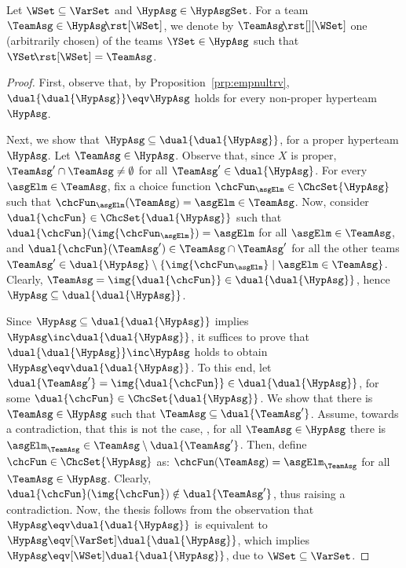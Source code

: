 \documentclass[authoryear]{elsarticle}
\newcommand{\EmpTeamAsg}{\emptyset}
\begin{document}
Let $\WSet \subseteq \VarSet$ and $\HypAsg \in \HypAsgSet$.
For a team $\TeamAsg \in \HypAsg \!\rst[\WSet]$, we denote by $\asgExtWX$
one (arbitrarily chosen) of the teams $\YSet \in \HypAsg$ such that $\YSet
\!\rst[\WSet] = \TeamAsg$.

\lmmdlti*
%
\begin{proof}
  First, observe that, by Proposition~\ref{prp:empnultrv},
  $\dual{\dual{\HypAsg}} \eqv \HypAsg$ holds for every non-proper hyperteam
  $\HypAsg$.

  Next, we show that $\HypAsg \subseteq \dual{\dual{\HypAsg}}$, for a proper
  hyperteam $\HypAsg$.
  Let $\TeamAsg \in \HypAsg$.
  Observe that, since $X$ is proper, $\TeamAsg' \cap \TeamAsg \neq \EmpTeamAsg$
  for all $\TeamAsg' \in \dual{\HypAsg}$.
  For every $\asgElm \in \TeamAsg$, fix a choice function $\chcFun_{\asgElm} \in
  \ChcSet{\HypAsg}$ such that $\chcFun_{\asgElm}(\TeamAsg) = \asgElm \in
  \TeamAsg$.
  Now, consider $\dual{\chcFun} \in \ChcSet{\dual{\HypAsg}}$ such that
  $\dual{\chcFun}(\img{\chcFun_{\asgElm}}) = \asgElm$ for all $\asgElm \in
  \TeamAsg$, and $\dual{\chcFun}(\TeamAsg') \in \TeamAsg \cap
  \TeamAsg'$ for all the other teams $\TeamAsg' \in \dual{\HypAsg}
  \setminus \{ \img{\chcFun_{\asgElm}} \mid \asgElm \in \TeamAsg \}$.
  Clearly, $\TeamAsg = \img{\dual{\chcFun}} \in \dual{\dual{\HypAsg}}$, hence
  $\HypAsg \subseteq \dual{\dual{\HypAsg}}$.

  Since $\HypAsg \subseteq \dual{\dual{\HypAsg}}$ implies $\HypAsg \inc
  \dual{\dual{\HypAsg}}$, it suffices to prove that $\dual{\dual{\HypAsg}} \inc
  \HypAsg$ holds to obtain $\HypAsg \eqv \dual{\dual{\HypAsg}}$.
  To this end, let $\dual{\TeamAsg'} = \img{\dual{\chcFun}} \in
  \dual{\dual{\HypAsg}}$, for some $\dual{\chcFun} \in \ChcSet{\dual{\HypAsg}}$.
  We show that there is $\TeamAsg \in \HypAsg$ such that $\TeamAsg \subseteq
  \dual{\TeamAsg'}$.
  Assume, towards a contradiction, that this is not the case, \ie, for all
  $\TeamAsg \in \HypAsg$ there is $\asgElm_{\TeamAsg} \in \TeamAsg \setminus
  \dual{\TeamAsg'}$.
  Then, define $\chcFun \in \ChcSet{\HypAsg}$ as: $\chcFun(\TeamAsg) =
  \asgElm_{\TeamAsg}$ for all $\TeamAsg \in \HypAsg$.
  Clearly, $\dual{\chcFun}(\img{\chcFun}) \notin \dual{\TeamAsg'}$, thus raising
  a contradiction.
  Now, the thesis follows from the observation that $\HypAsg \eqv
  \dual{\dual{\HypAsg}}$ is equivalent to $\HypAsg \eqv[\VarSet]
  \dual{\dual{\HypAsg}}$, which implies $\HypAsg \eqv[\WSet]
  \dual{\dual{\HypAsg}}$, due to $\WSet \subseteq \VarSet$.
%
\end{proof}
\end{document}
